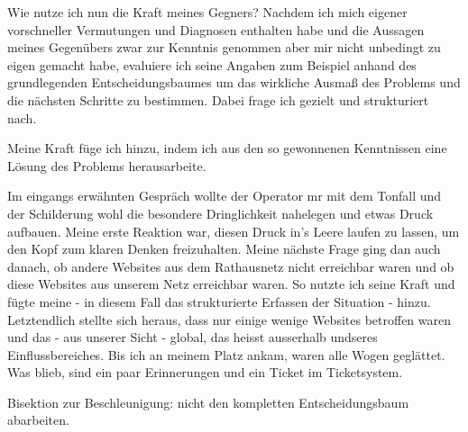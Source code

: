 \begin{normaltext}
Wie nutze ich nun die Kraft meines Gegners? Nachdem ich mich eigener
vorschneller Vermutungen und Diagnosen enthalten habe und die Aussagen meines
Gegenübers zwar zur Kenntnis genommen aber mir nicht unbedingt zu eigen
gemacht habe, evaluiere ich seine Angaben zum Beispiel anhand des
grundlegenden Entscheidungsbaumes um das wirkliche Ausmaß des Problems und die
nächsten Schritte zu bestimmen. Dabei frage ich gezielt und strukturiert nach.

Meine Kraft füge ich hinzu, indem ich aus den so gewonnenen Kenntnissen eine
Lösung des Problems herausarbeite.

Im eingangs erwähnten Gespräch wollte der Operator mr mit dem Tonfall und der
Schilderung wohl die besondere Dringlichkeit nahelegen und etwas Druck
aufbauen. Meine erste Reaktion war, diesen Druck in's Leere laufen zu lassen,
um den Kopf zum klaren Denken freizuhalten. Meine nächste Frage ging dan auch
danach, ob andere Websites aus dem Rathausnetz nicht erreichbar waren und ob
diese Websites aus unserem Netz erreichbar waren. So nutzte ich seine Kraft
und fügte meine - in diesem Fall das strukturierte Erfassen der Situation -
hinzu. Letztendlich stellte sich heraus, dass nur einige wenige Websites
betroffen waren und das - aus unserer Sicht - global, das heisst ausserhalb
undseres Einflussbereiches. Bis ich an meinem Platz ankam, waren alle Wogen
geglättet. Was blieb, sind ein paar Erinnerungen und ein Ticket im
Ticketsystem.

\end{normaltext}

\begin{notes}
\item Bisektion zur Beschleunigung: nicht den kompletten Entscheidungsbaum
  abarbeiten.
\end{notes}




